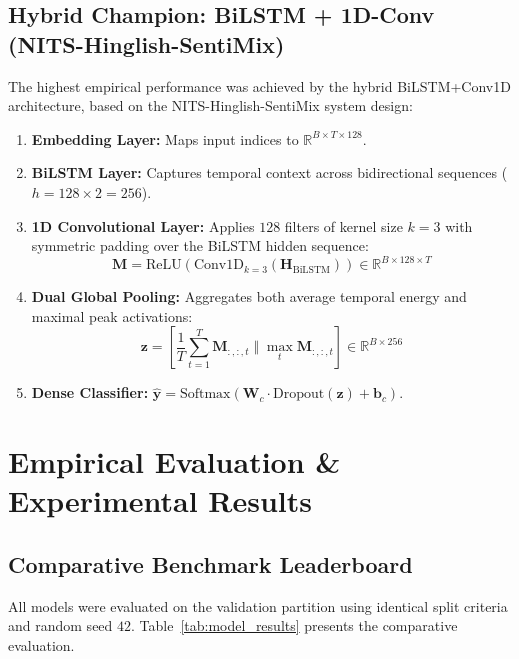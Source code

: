\documentclass[11pt,a4paper]{article}
\begin{document}
\subsection{Hybrid Champion: BiLSTM + 1D-Conv (NITS-Hinglish-SentiMix)}
The highest empirical performance was achieved by the hybrid BiLSTM+Conv1D architecture, based on the NITS-Hinglish-SentiMix system design:
\begin{enumerate}
    \item \textbf{Embedding Layer:} Maps input indices to $\mathbb{R}^{B \times T \times 128}$.
    \item \textbf{BiLSTM Layer:} Captures temporal context across bidirectional sequences ($h = 128 \times 2 = 256$).
    \item \textbf{1D Convolutional Layer:} Applies $128$ filters of kernel size $k=3$ with symmetric padding over the BiLSTM hidden sequence:
    \begin{equation}
        \mathbf{M} = \text{ReLU}(\text{Conv1D}_{k=3}(\mathbf{H}_{\text{BiLSTM}})) \in \mathbb{R}^{B \times 128 \times T}
    \end{equation}
    \item \textbf{Dual Global Pooling:} Aggregates both average temporal energy and maximal peak activations:
    \begin{equation}
        \mathbf{z} = \left[ \frac{1}{T} \sum_{t=1}^T \mathbf{M}_{:, :, t} \;\Big\Vert\; \max_{t} \mathbf{M}_{:, :, t} \right] \in \mathbb{R}^{B \times 256}
    \end{equation}
    \item \textbf{Dense Classifier:} $\hat{\mathbf{y}} = \text{Softmax}(\mathbf{W}_c \cdot \text{Dropout}(\mathbf{z}) + \mathbf{b}_c)$.
\end{enumerate}

\section{Empirical Evaluation \& Experimental Results}

\subsection{Comparative Benchmark Leaderboard}
All models were evaluated on the validation partition using identical split criteria and random seed $42$. Table~\ref{tab:model_results} presents the comparative evaluation.
\end{document}
